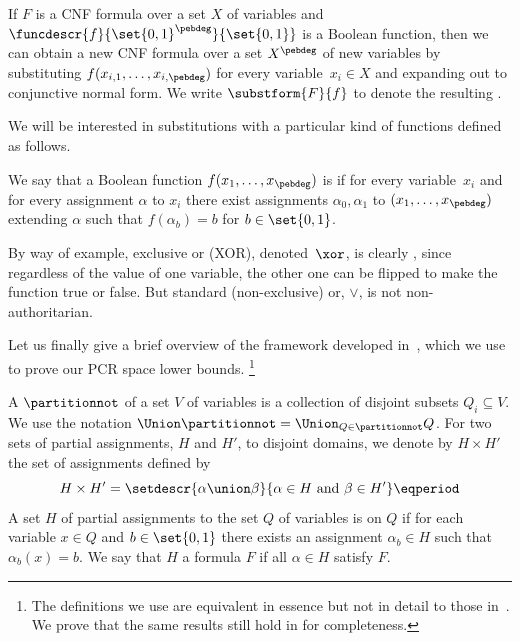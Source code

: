 %
%
%
%
%
%
%
%

\begin{definition}
  \label{def:substituted-formula}
If $F$ is a CNF formula over a set %
$X$ of variables  %
and
$\funcdescr{f}{\set{0, 1}^{\pebdeg}}{\set{0, 1}}$
is a Boolean function, then 
we can obtain a new CNF formula over a set
%
$X^{\pebdeg}$ of new variables  %
by
%
substituting $f(x_{i,1}, \ldots, x_{i,\pebdeg})$ for every variable~$x_i\in X$
%
%
%
%
and expanding out to conjunctive normal form. We write 
$\substform{F}{f}$   %
%
to denote the resulting . %
\end{definition}
We will be
interested in substitutions with a
particular kind of functions defined as follows.

\begin{definition}
  \label{def:nonauth-func}
  We say that
  a Boolean function $f(x_1, \ldots, x_{\pebdeg})$ is
  \introduceterm{\nonauthor{}} if for every
  variable~$x_i$ %
  and for every
  assignment $\alpha$ to
  $x_i$ there exist %
%
assignments  %
$\alpha_0, \alpha_1$
to $(x_1,\dots,x_{\pebdeg})$   %
%
%
%
%
extending $\alpha$ such that $f(\alpha_b) = b$ for $b \in \set{0, 1}$.
\end{definition}

By way of example, exclusive or (XOR), denoted~$\xor$, 
is clearly \nonauthor, since regardless of the
value of one variable, the other one can be flipped to make the
function true or false.  %
%
But standard (non-exclusive) or, $\lor$, is not non-authoritarian.  %
%
%
%
%

%
%
Let us finally give a brief overview of the framework developed
in~\cite{BG15Framework},
which we use to prove our PCR space lower bounds.%
%
%
%
%
%
%
\footnote{The definitions we use are equivalent in essence but not in detail to those in~\cite{BG15Framework}.
%
%
%
%
We prove that the same results still hold in
%
%
    for completeness.}

A 
$\partitionnot$ of a
%
set $V$ of variables  %
is a collection of disjoint %
subsets  %
$Q_i\subseteq V$. 
We use the notation $\Union \partitionnot =
%
%
\Union_{Q\in\partitionnot} Q$. %
For two sets of partial
assignments, $H$ and $H'$, %
to disjoint domains, we denote by $H \times H'$ the set of 
assignments %
%
%
%
defined by \[ H \times H' = \setdescr{\alpha \union
  \beta}{\alpha \in H \text{\ and\ } \beta \in H'} \eqperiod\] %
A set %
$H$ of partial assignments  %
to the %
%
set $Q$ of variables  %
is
\introduceterm{\flippable{}} on $Q$ if for each
variable $x \in Q$ and $b \in \set{0, 1}$ there exists an assignment
$\alpha_b \in H$ such that $\alpha_b(x) = b$. 
%
We say that
$H$  a formula $F$ if all 
$\alpha \in H$
%
satisfy $F$.

